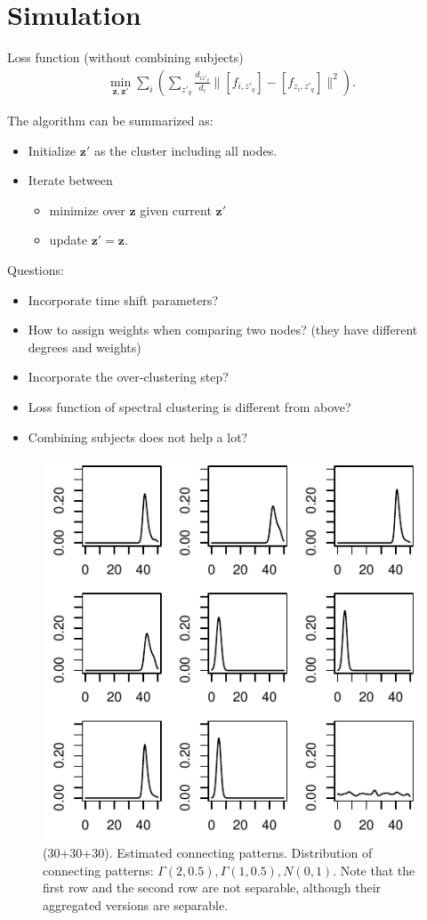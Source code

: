 
\section{Simulation} \label{sec:simulation}

Loss function (without combining subjects)
\begin{align*}
\min_{\mathbf{z}, \mathbf{z'}} \sum_{i} \left(  \sum_{z'_q} \frac{d_{iz'_q}}{d_i} \Big\| [f_{i,z'_q}] - [f_{z_i, z'_q}] \Big\|^2 \right) .
\end{align*}

The algorithm can be summarized as:
\begin{itemize}
	\item Initialize $\mathbf{z'}$ as the cluster including all nodes. 
	\item Iterate between 
	\begin{itemize}
		\item minimize over $\mathbf{z}$ given current $\mathbf{z'}$
		\item update $\mathbf{z'}=\mathbf{z}$.
	\end{itemize}	
\end{itemize}

Questions:
\begin{itemize}
	\item Incorporate time shift parameters?
	\item How to assign weights when comparing two nodes? (they have different degrees and weights)
	\item Incorporate the over-clustering step?
	\item Loss function of spectral clustering is different from above?
	\item Combining subjects does not help a lot?
\end{itemize}



\begin{figure}[H]
\includegraphics[width=.6\textwidth]{../simulation/plots/case3_conn_patt}
\caption{(30+30+30). Estimated connecting patterns. Distribution of connecting patterns: $\Gamma(2,0.5),\Gamma(1,0.5),N(0,1)$. Note that the first row and the second row are not separable, although their aggregated versions are separable.}
\end{figure}


